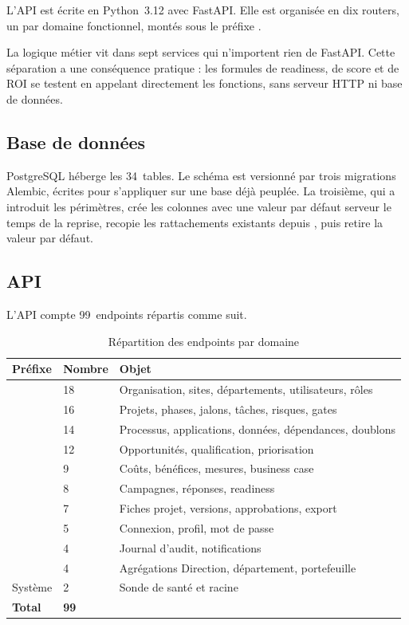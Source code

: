 L'API est écrite en Python~3.12 avec FastAPI. Elle est organisée en dix routers, un par
domaine fonctionnel, montés sous le préfixe .

La logique métier vit dans sept services qui n'importent rien de FastAPI. Cette
séparation a une conséquence pratique : les formules de readiness, de score et de ROI
se testent en appelant directement les fonctions, sans serveur HTTP ni base de données.

\subsection{Base de données}

PostgreSQL héberge les 34~tables. Le schéma est versionné par trois migrations Alembic,
écrites pour s'appliquer sur une base déjà peuplée. La troisième, qui a introduit les
périmètres, crée les colonnes avec une valeur par défaut serveur le temps de la reprise,
recopie les rattachements existants depuis , puis retire la valeur
par défaut.

\subsection{API}

L'API compte 99~endpoints répartis comme suit.

\begin{table}[H]
\centering
\caption{Répartition des endpoints par domaine}
\label{tab:endpoints}
\small
\begin{tabular}{@{}L{3.6cm} C{1.6cm} L{8.2cm}@{}}
\toprule
\textbf{Préfixe} & \textbf{Nombre} & \textbf{Objet} \\
\midrule
{}           & 18 & Organisation, sites, départements, utilisateurs, rôles \\
      & 16 & Projets, phases, jalons, tâches, risques, gates \\
     & 14 & Processus, applications, données, dépendances, doublons \\
 & 12 & Opportunités, qualification, priorisation \\
         &  9 & Coûts, bénéfices, mesures, business case \\
    &  8 & Campagnes, réponses, readiness \\
        &  7 & Fiches projet, versions, approbations, export \\
          &  5 & Connexion, profil, mot de passe \\
         &  4 & Journal d'audit, notifications \\
    &  4 & Agrégations Direction, département, portefeuille \\
Système               &  2 & Sonde de santé et racine \\
\midrule
\textbf{Total}        & \textbf{99} & \\
\bottomrule
\end{tabular}
\end{table}

